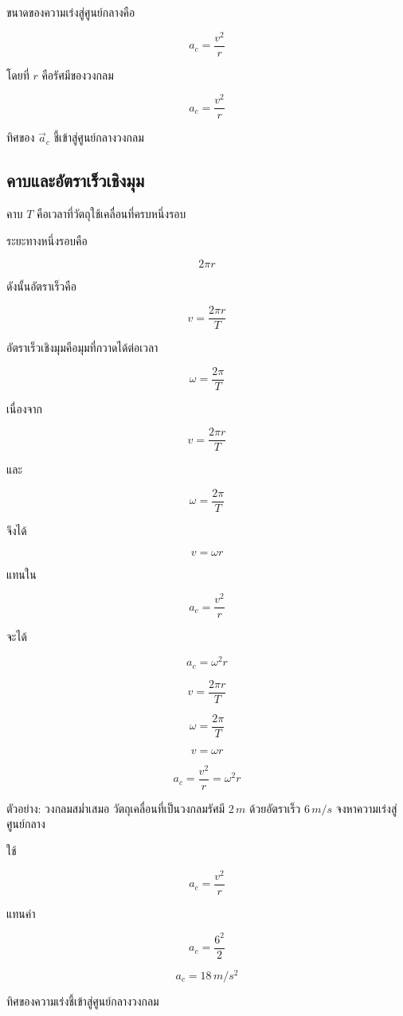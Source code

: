 ขนาดของความเร่งสู่ศูนย์กลางคือ

\[
a_c=\frac{v^2}{r}
\]

โดยที่ $r$ คือรัศมีของวงกลม

\begin{tcolorbox}[title=ความเร่งสู่ศูนย์กลาง]
\[
a_c=\frac{v^2}{r}
\]

ทิศของ $\vec{a}_c$ ชี้เข้าสู่ศูนย์กลางวงกลม
\end{tcolorbox}

\subsection{คาบและอัตราเร็วเชิงมุม}

คาบ $T$ คือเวลาที่วัตถุใช้เคลื่อนที่ครบหนึ่งรอบ

ระยะทางหนึ่งรอบคือ

\[
2\pi r
\]

ดังนั้นอัตราเร็วคือ

\[
v=\frac{2\pi r}{T}
\]

อัตราเร็วเชิงมุมคือมุมที่กวาดได้ต่อเวลา

\[
\omega=\frac{2\pi}{T}
\]

เนื่องจาก

\[
v=\frac{2\pi r}{T}
\]

และ

\[
\omega=\frac{2\pi}{T}
\]

จึงได้

\[
v=\omega r
\]

แทนใน

\[
a_c=\frac{v^2}{r}
\]

จะได้

\[
a_c=\omega^2r
\]

\begin{tcolorbox}[title=สูตรวงกลมสม่ำเสมอ]
\[
v=\frac{2\pi r}{T}
\]

\[
\omega=\frac{2\pi}{T}
\]

\[
v=\omega r
\]

\[
a_c=\frac{v^2}{r}=\omega^2r
\]
\end{tcolorbox}

\begin{examplebox}{ตัวอย่าง: วงกลมสม่ำเสมอ}
วัตถุเคลื่อนที่เป็นวงกลมรัศมี $2\,\si{m}$ ด้วยอัตราเร็ว $6\,\si{m/s}$ จงหาความเร่งสู่ศูนย์กลาง

ใช้

\[
a_c=\frac{v^2}{r}
\]

แทนค่า

\[
a_c=\frac{6^2}{2}
\]

\[
a_c=18\,\si{m/s^2}
\]

ทิศของความเร่งชี้เข้าสู่ศูนย์กลางวงกลม
\end{examplebox}

